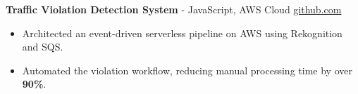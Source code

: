 \documentclass[11pt]{article}       %
\begin{document}
\textbf{Traffic Violation Detection System}{ - JavaScript, AWS Cloud} \hfill \href{https://github.com/Monica20030707/AWS_rekonigition-N-read-database}{github.com} \\
\vspace{-9pt}
\begin{itemize}
  \item Architected an event-driven serverless pipeline on AWS using Rekognition and SQS.
  \item Automated the violation workflow, reducing manual processing time by over \textbf{90\%}.
\end{itemize}

\end{document}
